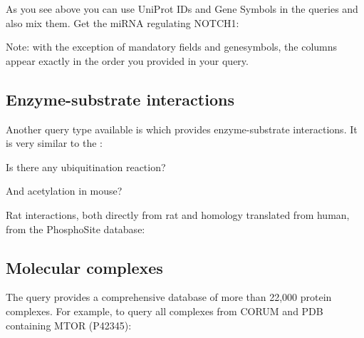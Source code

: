 \documentclass[letterpaper,10pt,english]{sphinxmanual}
\begin{document}
As you see above you can use UniProt IDs and Gene Symbols in the queries and
also mix them. Get the miRNA regulating NOTCH1:
\begin{quote}

\end{quote}

Note: with the exception of mandatory fields and genesymbols, the columns
appear exactly in the order you provided in your query.


\subsection{Enzyme-substrate interactions}
\label{\detokenize{index:enzyme-substrate-interactions}}
Another query type available is  which provides enzyme-substrate
interactions. It is very similar to the :
\begin{quote}

\end{quote}

Is there any ubiquitination reaction?
\begin{quote}

\end{quote}

And acetylation in mouse?
\begin{quote}

\end{quote}

Rat interactions, both directly from rat and homology translated from human,
from the PhosphoSite database:
\begin{quote}

\end{quote}


\subsection{Molecular complexes}
\label{\detokenize{index:molecular-complexes}}
The  query provides a comprehensive database of more than 22,000
protein complexes. For example, to query all complexes from CORUM and PDB
containing MTOR (P42345):
\begin{quote}

\end{quote}
\end{document}
